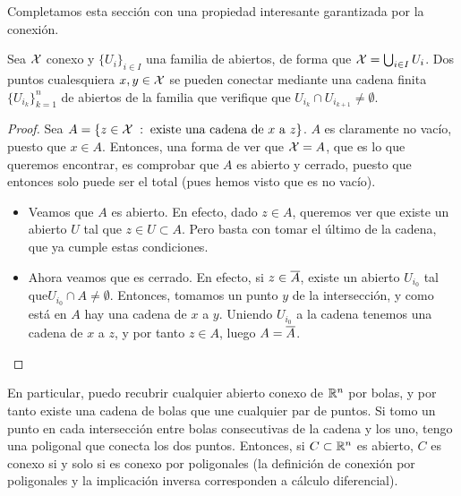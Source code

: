 Completamos esta sección con una propiedad interesante garantizada por la conexión.

\begin{lem}
	Sea $\mathcal{X}$ conexo y $\{U_i\}_{i\in I}$ una familia de abiertos, de forma que $\mathcal{X}=\bigcup_{i\in I} U_i$. Dos puntos cualesquiera $x,y\in\mathcal{X}$ se pueden conectar mediante una cadena finita $\{U_{i_k}\}_{k=1}^n$ de abiertos de la familia que verifique que $U_{i_k}\cap U_{i_{k+1}}\neq\emptyset$.
	
	\begin{proof}
		Sea $A=\{z\in\mathcal{X} \;:\; \text{existe una cadena de } x \text{ a } z \}$. $A$ es claramente no vacío, puesto que $x\in A$. Entonces, una forma de ver que $\mathcal{X}=A$, que es lo que queremos encontrar, es comprobar que $A$ es abierto y cerrado, puesto que entonces solo puede ser el total (pues hemos visto que es no vacío).
		
		\begin{itemize}
			\item Veamos que $A$ es abierto. En efecto, dado $z\in A$, queremos ver que existe un abierto $U$ tal que $z\in U\subset A$. Pero basta con tomar el último de la cadena, que ya cumple estas condiciones.
			
			\item Ahora veamos que es cerrado. En efecto, si $z\in\overline{A}$, existe un abierto $U_{i_0}$ tal que$U_{i_0}\cap A\neq\emptyset$. Entonces, tomamos un punto $y$ de la intersección, y como está en $A$ hay una cadena de $x$ a $y$. Uniendo $U_{i_0}$ a la cadena tenemos una cadena de $x$ a $z$, y por tanto $z\in A$, luego $A=\overline{A}$. \qedhere
		\end{itemize}
	\end{proof}
\end{lem}

\begin{obs}
	En particular, puedo recubrir cualquier abierto conexo de $\mathbb{R}^n$ por bolas, y por tanto existe una cadena de bolas que une cualquier par de puntos. Si tomo un punto en cada intersección entre bolas consecutivas de la cadena y los uno, tengo una poligonal que conecta los dos puntos. Entonces, si $C\subset\mathbb{R}^n$ es abierto, $C$ es conexo si y solo si es conexo por poligonales (la definición de conexión por poligonales y la implicación inversa corresponden a cálculo diferencial).
\end{obs}